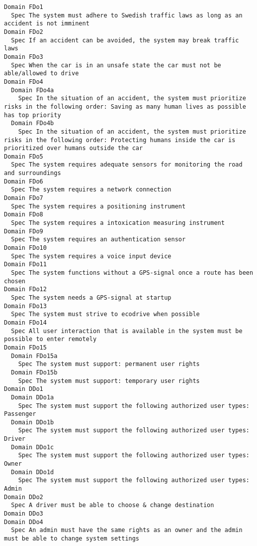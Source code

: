 \begin{lstlisting}
Domain FDo1
  Spec The system must adhere to Swedish traffic laws as long as an accident is not imminent
Domain FDo2
  Spec If an accident can be avoided, the system may break traffic laws
Domain FDo3
  Spec When the car is in an unsafe state the car must not be able/allowed to drive
Domain FDo4
  Domain FDo4a
    Spec In the situation of an accident, the system must prioritize risks in the following order: Saving as many human lives as possible has top priority
  Domain FDo4b
    Spec In the situation of an accident, the system must prioritize risks in the following order: Protecting humans inside the car is prioritized over humans outside the car
Domain FDo5
  Spec The system requires adequate sensors for monitoring the road and surroundings
Domain FDo6
  Spec The system requires a network connection
Domain FDo7
  Spec The system requires a positioning instrument
Domain FDo8
  Spec The system requires a intoxication measuring instrument
Domain FDo9
  Spec The system requires an authentication sensor
Domain FDo10
  Spec The system requires a voice input device
Domain FDo11
  Spec The system functions without a GPS-signal once a route has been chosen
Domain FDo12
  Spec The system needs a GPS-signal at startup
Domain FDo13
  Spec The system must strive to ecodrive when possible
Domain FDo14
  Spec All user interaction that is available in the system must be possible to enter remotely
Domain FDo15
  Domain FDo15a
    Spec The system must support: permanent user rights
  Domain FDo15b
    Spec The system must support: temporary user rights
Domain DDo1
  Domain DDo1a
    Spec The system must support the following authorized user types: Passenger
  Domain DDo1b
    Spec The system must support the following authorized user types: Driver
  Domain DDo1c
    Spec The system must support the following authorized user types: Owner
  Domain DDo1d
    Spec The system must support the following authorized user types: Admin
Domain DDo2
  Spec A driver must be able to choose & change destination
Domain DDo3
Domain DDo4
  Spec An admin must have the same rights as an owner and the admin must be able to change system settings

\end{lstlisting}